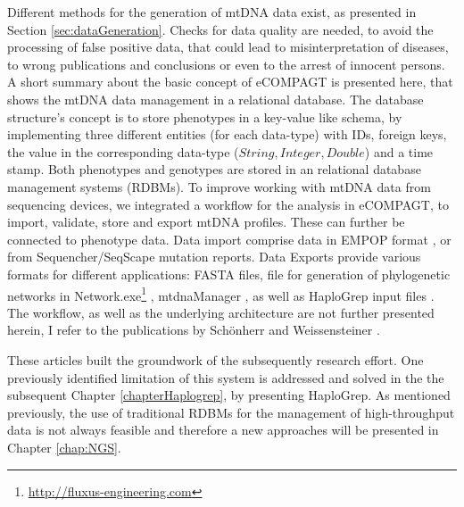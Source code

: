 Different methods for the generation of mtDNA data exist, as presented in Section \ref{sec:dataGeneration}. Checks for data quality are needed, to avoid the processing of false positive data, that could lead to misinterpretation of diseases, to wrong publications and conclusions or even to the arrest of innocent persons.
A short summary about the basic concept of eCOMPAGT is presented here, that shows the mtDNA data management in a relational database. The database structure's concept is to store phenotypes in a key-value like schema, by implementing three different entities (for each data-type) with IDs, foreign keys, the value in the corresponding data-type ($String, Integer, Double$) and a time stamp.
Both phenotypes and genotypes are stored in an relational database management systems (RDBMs). To improve working with mtDNA data from sequencing devices, we integrated a workflow for the analysis in eCOMPAGT, to import, validate, store and export mtDNA profiles. These can further be connected to phenotype data. Data import comprise data in EMPOP format \cite{Parson2007}, or from Sequencher/SeqScape mutation reports. Data Exports provide various formats for different applications: FASTA files, file for generation of phylogenetic networks in Network.exe\footnote{\url{http://fluxus-engineering.com}}  \cite{Bandelt1999}, mtdnaManager \cite{Lee2008}, as well as HaploGrep input files \cite{Kloss-Brandstatter2011,Weissensteiner2016a}. The workflow, as well as the underlying architecture are not further presented herein, I refer to the publications by Sch\"onherr and Weissensteiner \cite{Schoenherr2009,Weissensteiner2010}.

These articles built the groundwork of the subsequently research effort. One previously identified limitation of this system is addressed and solved in the the subsequent Chapter \ref{chapterHaplogrep}, by presenting HaploGrep. As mentioned previously, the use of traditional RDBMs for the management of high-throughput data is not always feasible and therefore a new approaches will be presented in Chapter \ref{chap:NGS}. 

